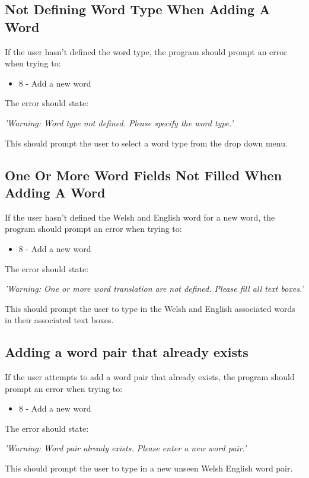 \documentclass{project}
\begin{document}
\subsection{Not Defining Word Type When Adding A Word}
If the user hasn't defined the word type, the program should prompt an error when trying to:
\begin{itemize}
	\item 8 - Add a new word
	\end{itemize}
The error should state:
\begin{center}
	\emph{'Warning: Word type not defined. Please specify the word type.'}
\end{center}
This should prompt the user to select a word type from the drop down menu.
\subsection{One Or More Word Fields Not Filled When Adding A Word}
If the user hasn't defined the Welsh and English word for a new word, the program should prompt an error when trying to:
\begin{itemize}
	\item 8 - Add a new word
	\end{itemize}
The error should state:
\begin{center}
	\emph{'Warning: One or more word translation are not defined. Please fill all text boxes.'}
\end{center}
This should prompt the user to type in the Welsh and English associated words in their associated text boxes.
\subsection{Adding a word pair that already exists}
If the user attempts to add a word pair that already exists, the program should prompt an error when trying to:
\begin{itemize}
	\item 8 - Add a new word
	\end{itemize}
The error should state:
\begin{center}
	\emph{'Warning: Word pair already exists. Please enter a new word pair.'}
\end{center}
This should prompt the user to type in a new unseen Welsh English word pair.
\end{document}
